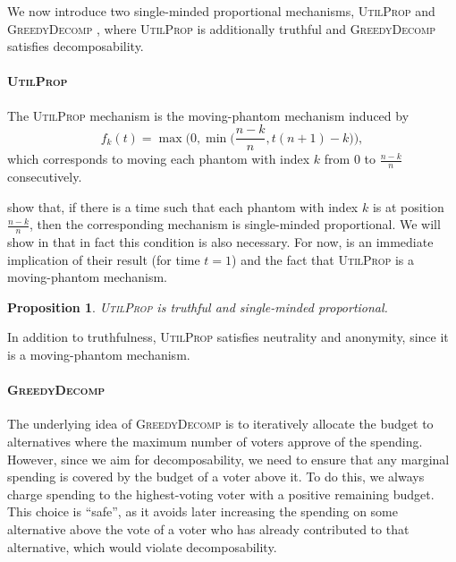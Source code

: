 \documentclass[11pt]{article}
\newcommand{\UtP}{\textsc{UtilProp} }
\newcommand{\GrdDec}{\textsc{GreedyDecomp} }
\newtheorem{proposition}{Proposition}
\begin{document}
We now introduce two single-minded proportional mechanisms, \UtP and \GrdDec, where \UtP is additionally truthful and \GrdDec satisfies decomposability.

\paragraph{\UtP}
The \UtP mechanism is the moving-phantom mechanism induced by
\begin{equation*}
    f_k(t) = \max\bigg(0, \min\bigg(\frac{n-k}{n}, t(n+1)-k\bigg)\bigg),
\end{equation*}
which corresponds to moving each phantom with index $k$ from $0$ to $\frac{n-k}{n}$ consecutively.

\citet{freeman2021truthful} show that, if there is a time such that each phantom with index $k$ is at position $\frac{n-k}{n}$, then the corresponding mechanism is single-minded proportional. We will show in  that in fact this condition is also necessary. For now,  is an immediate implication of their result (for time $t=1$) and the fact that \UtP is a moving-phantom mechanism.


\begin{proposition}
    \UtP is truthful and single-minded proportional. \label{prop:utilprop}
\end{proposition}

In addition to truthfulness, \UtP satisfies neutrality and anonymity, since it is a moving-phantom mechanism.

\paragraph{\GrdDec}
The underlying idea of \GrdDec is to iteratively allocate the budget to alternatives
where the maximum number of voters approve of the spending. However, since we aim for decomposability, we need to ensure that any marginal spending is covered by the budget of a voter above it. To do this, we always charge spending to the highest-voting voter with a positive remaining budget. This choice is ``safe'', as it avoids later increasing the spending on some alternative above the vote of a voter who has already contributed to that alternative, which would violate decomposability.
\end{document}
